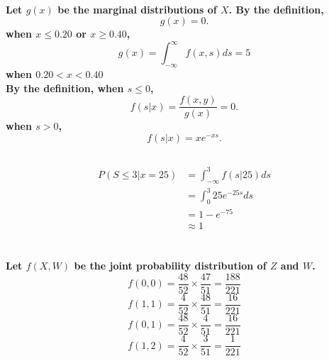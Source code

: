 \documentclass{article}
\begin{document}
            \paragraph{
                Let $g(x)$ be the marginal distributions of $X$. By the definition,
                $$g(x)=0.$$
                when $x\leq 0.20$ or $x\geq 0.40$,
                $$g(x)=\int _{-\infty} ^{\infty} f(x,s) ds=5$$
                when $0.20<x<0.40$\\
                By the definition, when $s\leq 0$,
                $$f(s|x)=\frac{f(x,y)}{g(x)}=0.$$
                when $s>0$,
                $$f(s|x)=xe^{-xs}.$$
            }      
        \subsection{}
            \paragraph{
                \begin{equation}
                    \begin{split}
                        P(S\leq 3|x=25)
                        &=\int_{-\infty} ^3 f(s|25) ds\\
                        &=\int_0 ^3 25e^{-25s} ds\\
                        &=1-e^{-75}\\
                        &\approx 1
                    \end{split}
                \end{equation}
            }
    \section{}
        \subsection{}
            \paragraph{
                Let $f(X,W)$ be the joint probability distribution of $Z$ and $W$.
                $$f(0,0)=\frac{48}{52}\times \frac{47}{51}=\frac{188}{221}$$
                $$f(1,1)=\frac{4}{52}\times\frac{48}{51}=\frac{16}{221}$$
                $$f(0,1)=\frac{48}{52}\times\frac{4}{51}=\frac{16}{221}$$
                $$f(1,2)=\frac{4}{52}\times\frac{3}{51}=\frac{1}{221}$$
            }
\end{document}
